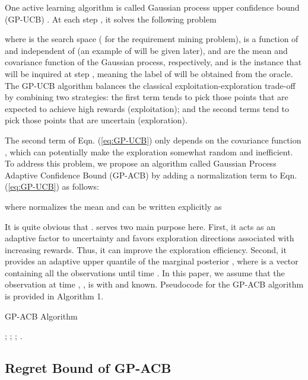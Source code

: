 \documentclass[10pt]{article}
\theoremstyle{plain}
\begin{document}
One active learning algorithm is called Gaussian process upper confidence bound (GP-UCB) \cite{srinivas2012information}. At each step , it solves the following problem

where  is the search space ( for the requirement mining problem),  is a function of  and independent of  (an example of  will be given later),  and  are the mean and covariance function of the Gaussian process, respectively, and  is the instance that will be inquired at step , meaning the label of  will be obtained from the oracle. The GP-UCB algorithm balances the classical exploitation-exploration trade-off by combining two strategies: the first term tends to pick those points that are expected to achieve high rewards (exploitation); and the second terms tend to pick those points that are uncertain (exploration). 

The second term of Eqn. (\ref{eq:GP-UCB}) only depends on the covariance function , which can potentially make the exploration somewhat random and inefficient. To address this problem, we propose an algorithm called Gaussian Process Adaptive Confidence Bound (GP-ACB) by adding a normalization term  to Eqn. (\ref{eq:GP-UCB}) as follows:

where  normalizes the mean  and can be written explicitly as

It is quite obvious that .  serves two main purpose here. First, it acts as an adaptive factor to uncertainty and favors exploration directions associated with increasing rewards. Thus, it can improve the exploration efficiency. Second, it provides an adaptive upper quantile of the marginal posterior , where  is a vector containing all the observations until time . In this paper, we assume that the observation at time , , is  with  and  known. Pseudocode for the GP-ACB algorithm is provided in Algorithm 1.

\begin{algorithm} \label{algorithm:GP-ACB}
 \caption{GP-ACB Algorithm}
\begin{algorithmic}[1]
  \FOR{}
  \STATE ;
  \STATE ;
  \STATE ;
  \STATE .
    \ENDFOR
\end{algorithmic}
\end{algorithm}

\subsection{Regret Bound of GP-ACB}
\end{document}
